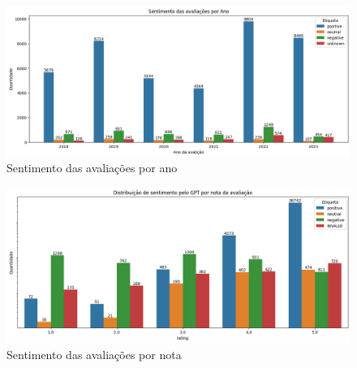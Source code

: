 \begin{figure}
	\centering
	\includegraphics[width=1\textwidth]{figs/gpt/sentimento_ano.png}
	\caption{Sentimento das avaliações por ano}
	\label{img:gpt_sentimento_ano}
\end{figure}

\begin{figure}
	\centering
	\includegraphics[width=1\textwidth]{figs/gpt/sentimento_nota.png}
	\caption{Sentimento das avaliações por nota}
	\label{img:gpt_sentimento_nota}
\end{figure}









